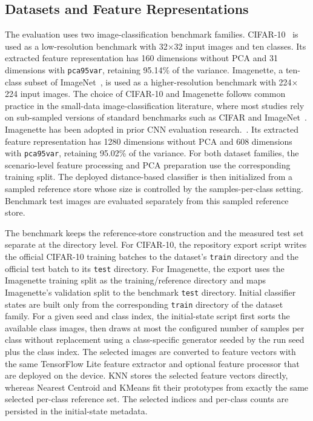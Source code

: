 \documentclass[sigconf,review,nonacm]{acmart}
\begin{document}
\subsection{Datasets and Feature Representations}
The evaluation uses two image-classification benchmark families.
CIFAR-10~\cite{krizhevsky2009cifar} is used as a low-resolution benchmark with 32$\times$32 input images and ten classes.
Its extracted feature representation has 160 dimensions without PCA and 31 dimensions with \texttt{pca95var}, retaining 95.14\% of the variance.
Imagenette, a ten-class subset of ImageNet~\cite{deng2009imagenet,howard2019imagenette}, is used as a higher-resolution benchmark with 224$\times$224 input images.
The choice of CIFAR-10 and Imagenette follows common practice in the small-data image-classification literature, where most studies rely on sub-sampled versions of standard benchmarks such as CIFAR and ImageNet~\cite{brigato2022small}. Imagenette has been adopted in prior CNN evaluation research.~\cite{saberifard2025xtorch}.
Its extracted feature representation has 1280 dimensions without PCA and 608 dimensions with \texttt{pca95var}, retaining 95.02\% of the variance.
For both dataset families, the scenario-level feature processing and PCA preparation use the corresponding training split.
The deployed distance-based classifier is then initialized from a sampled reference store whose size is controlled by the samples-per-class setting. Benchmark test images are evaluated separately from this sampled reference store.

The benchmark keeps the reference-store construction and the measured test set separate at the directory level.
For CIFAR-10, the repository export script writes the official CIFAR-10 training batches to the dataset's \texttt{train} directory and the official test batch to its \texttt{test} directory.
For Imagenette, the export uses the Imagenette training split as the training/reference directory and maps Imagenette's validation split to the benchmark \texttt{test} directory.
Initial classifier states are built only from the corresponding \texttt{train} directory of the dataset family.
For a given seed and class index, the initial-state script first sorts the available class images, then draws at most the configured number of samples per class without replacement using a class-specific generator seeded by the run seed plus the class index.
The selected images are converted to feature vectors with the same TensorFlow Lite feature extractor and optional feature processor that are deployed on the device.
KNN stores the selected feature vectors directly, whereas Nearest Centroid and KMeans fit their prototypes from exactly the same selected per-class reference set. The selected indices and per-class counts are persisted in the initial-state metadata.
\end{document}

